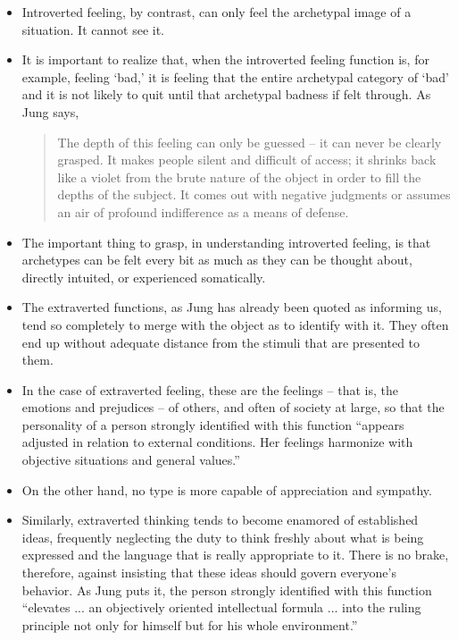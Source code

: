 \begin{itemize}
\item Introverted feeling, by contrast, can only feel the archetypal image of a situation. It cannot see it.

\item It is important to realize that, when the introverted feeling function
is, for example, feeling `bad,' it is feeling that the entire archetypal
category of `bad' and it is not likely to quit until that archetypal badness
if felt through. As Jung says,

\begin{quote}
The depth of this feeling can only be guessed -- it can never be clearly
grasped. It makes people silent and difficult of access; it shrinks back like a
violet from the brute nature of the object in order to fill the depths of the
subject. It comes out with negative judgments or assumes an air of profound
indifference as a means of defense.
\end{quote}

\item The important thing to grasp, in understanding introverted feeling, is
that archetypes can be felt every bit as much as they can be thought about,
directly intuited, or experienced somatically.

\item The extraverted functions, as Jung has already been quoted as informing
us, tend so completely to merge with the object as to identify with it.
They often end up without adequate distance from the stimuli that are presented to them.

\item In the case of extraverted feeling, these are the feelings -- that is,
the emotions and prejudices -- of others, and often of society at large, so
that the personality of a person strongly identified with this function
``appears adjusted in relation to external conditions. Her feelings harmonize
with objective situations and general values.''

\item On the other hand, no type is more capable of appreciation and sympathy.

\item Similarly, extraverted thinking tends to become enamored of established
ideas, frequently neglecting the duty to think freshly about what is being
expressed and the language that is really appropriate to it. There is no brake,
therefore, against insisting that these ideas should govern everyone's
behavior. As Jung puts it, the person strongly identified with this function
``elevates ... an objectively oriented intellectual formula ... into the ruling
principle not only for himself but for his whole environment.''


\end{itemize}
